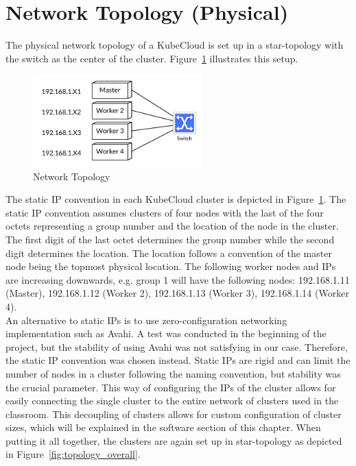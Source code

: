 
\section{Network Topology (Physical)}
The physical network topology of a KubeCloud is set up in a star-topology with the switch as the center of the cluster. Figure~\ref{fig:topology} illustrates this setup.

\begin{figure}[H]
    \centering
    \includegraphics[width=6.5cm]{figures/raspberry_cluster_topology}
    \caption{Network Topology}
    \label{fig:topology}
\end{figure}

\noindent
The static IP convention in each KubeCloud cluster is depicted in Figure~\ref{fig:topology}. The static IP convention assumes clusters of four nodes with the last of the four octets representing a group number and the location of the node in the cluster. The first digit of the last octet determines the group number while the second digit determines the location. The location follows a convention of the master node being the topmost physical location. The following worker nodes and IPs are increasing downwards, e.g. group 1 will have the following nodes: 192.168.1.11 (Master), 192.168.1.12 (Worker 2), 192.168.1.13 (Worker 3), 192.168.1.14 (Worker 4). \\

\noindent
An alternative to static IPs is to use zero-configuration networking implementation such as Avahi. A test was conducted in the beginning of the project, but the stability of using Avahi was not satisfying in our case. Therefore, the static IP convention was chosen instead. Static IPs are rigid and can limit the number of nodes in a cluster following the naming convention, but stability was the crucial parameter. This way of configuring the IPs of the cluster allows for easily connecting the single cluster to the entire network of clusters used in the classroom. This decoupling of clusters allows for custom configuration of cluster sizes, which will be explained in the software section of this chapter. When putting it all together, the clusters are again set up in star-topology as depicted in Figure~\ref{fig:topology_overall}.


